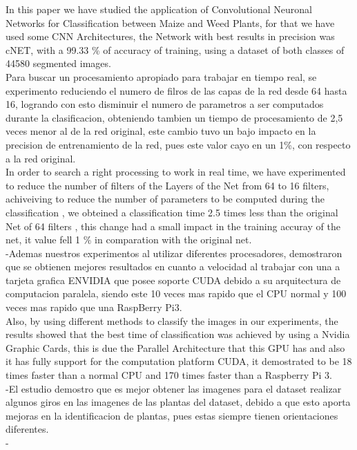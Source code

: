 \documentclass[conference]{IEEEtran}
\begin{document}
In this paper we have studied the application of Convolutional Neuronal Networks for Classification between Maize and Weed Plants, for that we have used some CNN Architectures, the Network with best results in precision was cNET, with a 99.33 \% of accuracy of training, using a dataset of both classes  of 44580 segmented images. \\

Para buscar un procesamiento apropiado para trabajar en tiempo real, se experimento reduciendo el numero de filros de las capas de la red desde 64 hasta 16, logrando con esto disminuir el numero de parametros a ser computados durante la clasificacion, obteniendo tambien un tiempo de procesamiento de 2,5 veces menor al de la red original, este cambio tuvo un bajo impacto en la precision de entrenamiento de la red, pues este valor cayo en un 1\%, con respecto a la red original.\\

In order to search a right processing to work in real time, we have experimented to reduce the number of filters of the Layers of the Net from 64 to 16 filters, achiveiving to reduce the number of parameters to be computed during the classification , we obteined a classification time 2.5 times less than the original Net of 64 filters , this change had a small impact in the training accuray of the net, it value fell 1 \% in comparation with the original net. \\

-Ademas  nuestros experimentos al utilizar diferentes procesadores, demostraron que se obtienen mejores resultados en cuanto a velocidad al trabajar con una  a tarjeta grafica ENVIDIA que posee soporte CUDA debido a su arquitectura de computacion paralela, siendo este 10 veces mas rapido que el CPU normal y 100 veces mas rapido que una RaspBerry Pi3.\\

Also, by using different methods to classify the images in our experiments, the results showed that the best time of classification was achieved by using a Nvidia Graphic Cards, this is due the Parallel Architecture that this GPU has and also it has fully support for the computation platform CUDA, it demostrated to be 18 times faster than a normal CPU and 170 times faster than a Raspberry Pi 3. \\

-El estudio demostro que es mejor obtener las imagenes para el dataset realizar algunos giros en las imagenes de las plantas del dataset, debido a que esto aporta mejoras en la identificacion de plantas, pues estas siempre tienen orientaciones diferentes.\\
-
\end{document}
